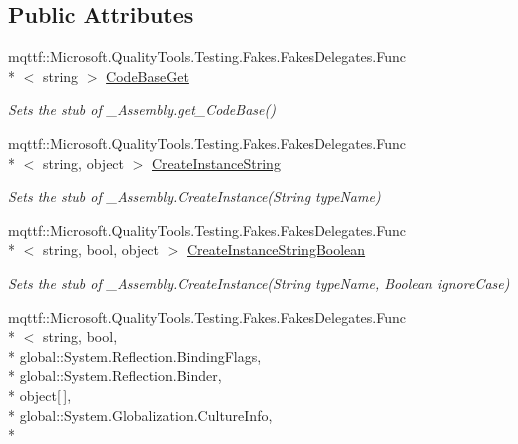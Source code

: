 \subsection*{Public Attributes}
\begin{DoxyCompactItemize}
\item 
mqttf\-::\-Microsoft.\-Quality\-Tools.\-Testing.\-Fakes.\-Fakes\-Delegates.\-Func\\*
$<$ string $>$ \hyperlink{class_system_1_1_runtime_1_1_interop_services_1_1_fakes_1_1_stub___assembly_a0158aabf17767f5cfb4c59708f725863}{Code\-Base\-Get}
\begin{DoxyCompactList}\small\item\em Sets the stub of \-\_\-\-Assembly.\-get\-\_\-\-Code\-Base()\end{DoxyCompactList}\item 
mqttf\-::\-Microsoft.\-Quality\-Tools.\-Testing.\-Fakes.\-Fakes\-Delegates.\-Func\\*
$<$ string, object $>$ \hyperlink{class_system_1_1_runtime_1_1_interop_services_1_1_fakes_1_1_stub___assembly_abe8bdf0cfd070698042a04a98c9eb1ce}{Create\-Instance\-String}
\begin{DoxyCompactList}\small\item\em Sets the stub of \-\_\-\-Assembly.\-Create\-Instance(\-String type\-Name)\end{DoxyCompactList}\item 
mqttf\-::\-Microsoft.\-Quality\-Tools.\-Testing.\-Fakes.\-Fakes\-Delegates.\-Func\\*
$<$ string, bool, object $>$ \hyperlink{class_system_1_1_runtime_1_1_interop_services_1_1_fakes_1_1_stub___assembly_ae2e82791449871cf9fcaa74441049ac1}{Create\-Instance\-String\-Boolean}
\begin{DoxyCompactList}\small\item\em Sets the stub of \-\_\-\-Assembly.\-Create\-Instance(\-String type\-Name, Boolean ignore\-Case)\end{DoxyCompactList}\item 
mqttf\-::\-Microsoft.\-Quality\-Tools.\-Testing.\-Fakes.\-Fakes\-Delegates.\-Func\\*
$<$ string, bool, \\*
global\-::\-System.\-Reflection.\-Binding\-Flags, \\*
global\-::\-System.\-Reflection.\-Binder, \\*
object\mbox{[}$\,$\mbox{]}, \\*
global\-::\-System.\-Globalization.\-Culture\-Info, \\*

\end{DoxyCompactItemize}
